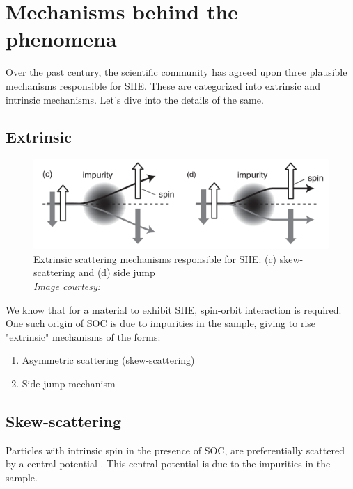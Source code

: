 \section{Mechanisms behind the phenomena}

\label{sec:mechanisms}

Over the past century, the scientific community has agreed upon three plausible mechanisms responsible for SHE. These are categorized into extrinsic and intrinsic mechanisms. Let's dive into the details of the same.

\subsection{Extrinsic}

\begin{figure}[h!]
    \centering
    \includegraphics[scale=0.6]{she-mechanisms.png}
    \caption{Extrinsic scattering mechanisms responsible for SHE: (c) skew-scattering and (d) side jump\\ \vspace{0.2cm} \textit{Image courtesy: \cite{murakami2015spin}}}
    \label{fig:skew-vs-side}
\end{figure}

We know that for a material to exhibit SHE, spin-orbit interaction is required. One such origin of SOC is due to impurities in the sample, giving to rise "extrinsic" mechanisms of the forms:

\begin{enumerate}
    \item Asymmetric scattering (skew-scattering)
    \item Side-jump mechanism
\end{enumerate}


\subsection*{Skew-scattering}

Particles with intrinsic spin in the presence of SOC, are preferentially scattered by a central potential \cite{mott1964w}.
This central potential is due to the impurities in the sample.

